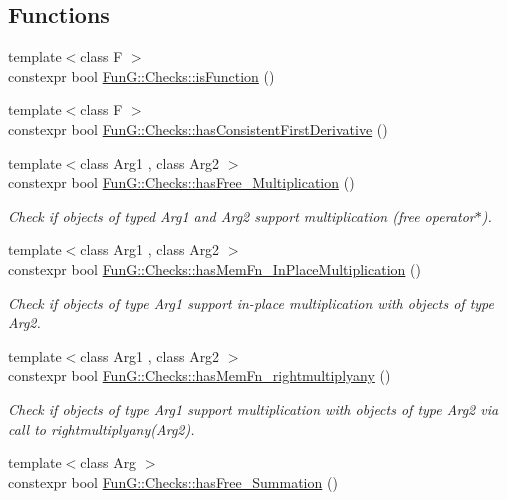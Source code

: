 \subsection*{Functions}
\begin{DoxyCompactItemize}
\item 
{\footnotesize template$<$class F $>$ }\\constexpr bool \hyperlink{group__Checks_gac6e6c5574a8497cc0749e5a613e4d57c}{Fun\+G\+::\+Checks\+::is\+Function} ()
\item 
{\footnotesize template$<$class F $>$ }\\constexpr bool \hyperlink{group__Checks_ga5f9a3a474205df6f565dd1a03ebb5e28}{Fun\+G\+::\+Checks\+::has\+Consistent\+First\+Derivative} ()
\item 
{\footnotesize template$<$class Arg1 , class Arg2 $>$ }\\constexpr bool \hyperlink{group__Checks_ga81302dfb773e50401ec899c3b9a53c4c}{Fun\+G\+::\+Checks\+::has\+Free\+\_\+\+Multiplication} ()
\begin{DoxyCompactList}\small\item\em Check if objects of typed Arg1 and Arg2 support multiplication (free operator$\ast$). \end{DoxyCompactList}\item 
{\footnotesize template$<$class Arg1 , class Arg2 $>$ }\\constexpr bool \hyperlink{group__Checks_ga1fb52331af88ccf29e380c8e5597e801}{Fun\+G\+::\+Checks\+::has\+Mem\+Fn\+\_\+\+In\+Place\+Multiplication} ()
\begin{DoxyCompactList}\small\item\em Check if objects of type Arg1 support in-\/place multiplication with objects of type Arg2. \end{DoxyCompactList}\item 
{\footnotesize template$<$class Arg1 , class Arg2 $>$ }\\constexpr bool \hyperlink{group__Checks_ga88d1f93f87cf5f51d426fcfee862d6f6}{Fun\+G\+::\+Checks\+::has\+Mem\+Fn\+\_\+rightmultiplyany} ()
\begin{DoxyCompactList}\small\item\em Check if objects of type Arg1 support multiplication with objects of type Arg2 via call to rightmultiplyany(\+Arg2). \end{DoxyCompactList}\item 
{\footnotesize template$<$class Arg $>$ }\\constexpr bool \hyperlink{group__Checks_ga8545906a81acf9f533c3342b0d02a6e9}{Fun\+G\+::\+Checks\+::has\+Free\+\_\+\+Summation} ()

\end{DoxyCompactItemize}
